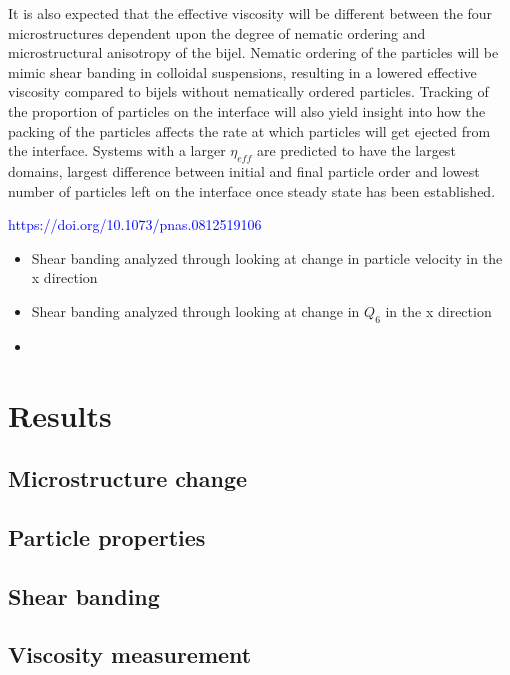 It is also expected that the effective viscosity will be different between the four microstructures dependent upon the 
degree of nematic ordering and microstructural anisotropy of the bijel. Nematic ordering of the particles will be mimic 
shear banding in colloidal suspensions, resulting in a lowered effective viscosity compared to bijels without nematically 
ordered particles. \cite{xu_relation_2013, vermant_flow-induced_2005} Tracking of the proportion of particles on the 
interface will also yield insight into how the packing of the particles affects the rate at which particles will get 
ejected from the interface. Systems with a larger $\eta_{eff}$ are predicted to have the largest domains, largest 
difference between initial and final particle order and lowest number of particles left on the interface once steady 
state has been established. 

\textcolor{blue}{https://doi.org/10.1073/pnas.0812519106}

\begin{itemize}
    \item Shear banding analyzed through looking at change in particle velocity in the x direction
    \item Shear banding analyzed through looking at change in $Q_6$ in the x direction
    \item 
\end{itemize}

\section{Results}\label{sec:results_p3}
\subsection{Microstructure change}

\subsection{Particle properties}

\subsection{Shear banding}

\subsection{Viscosity measurement}